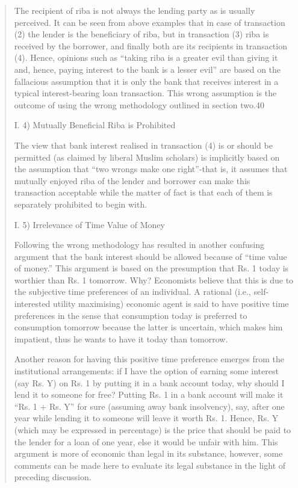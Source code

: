 \begin{quote}
The recipient of riba is not always the lending party as is usually perceived. It can be seen from above examples that in case of transaction (2) the lender is the beneficiary of riba, but in transaction (3) riba is received by the borrower, and finally both are its recipients in transaction (4). Hence, opinions such as “taking riba is a greater evil than giving it and, hence, paying interest to the bank is a lesser evil” are based on the fallacious assumption that it is only the bank that receives interest in a typical interest-bearing loan transaction. This wrong assumption is the outcome of using the wrong methodology outlined in section two.40

I. 4) Mutually Beneficial Riba is Prohibited

The view that bank interest realised in transaction (4) is or should be permitted (as claimed by liberal Muslim scholars) is implicitly based on the assumption that “two wrongs make one right”-that is, it assumes that mutually enjoyed riba of the lender and borrower can make this transaction acceptable while the matter of fact is that each of them is separately prohibited to begin with.

I. 5) Irrelevance of Time Value of Money

Following the wrong methodology has resulted in another confusing argument that the bank interest should be allowed because of “time value of money.” This argument is based on the presumption that Rs. 1 today is worthier than Rs. 1 tomorrow. Why? Economists believe that this is due to the subjective time preferences of an individual. A rational (i.e., self-interested utility maximising) economic agent is said to have positive time preferences in the sense that consumption today is preferred to consumption tomorrow because the latter is uncertain, which makes him impatient, thus he wants to have it today than tomorrow.

Another reason for having this positive time preference emerges from the institutional arrangements: if I have the option of earning some interest (say Rs. Y) on Rs. 1 by putting it in a bank account today, why should I lend it to someone for free? Putting Rs. 1 in a bank account will make it “Rs. 1 + Rs. Y” for sure (assuming away bank insolvency), say, after one year while lending it to someone will leave it worth Rs. 1. Hence, Rs. Y (which may be expressed in percentage) is the price that should be paid to the lender for a loan of one year, else it would be unfair with him. This argument is more of economic than legal in its substance, however, some comments can be made here to evaluate its legal substance in the light of preceding discussion.


\end{quote}
